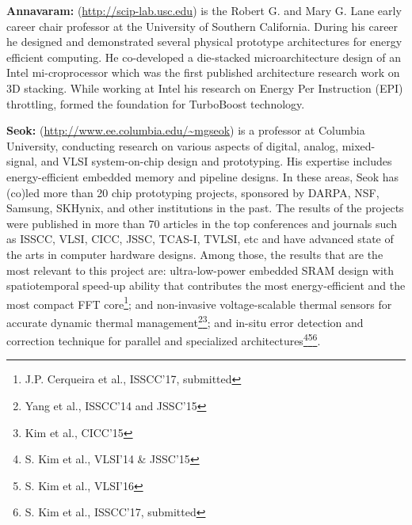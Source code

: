 \noindent
\textbf{Annavaram:} (\url{http://scip-lab.usc.edu}) is the Robert G. and Mary G. Lane early career chair professor at the University of Southern California. 
During his career he designed and demonstrated several physical prototype architectures for energy efficient computing. 
He co-developed a die-stacked microarchitecture design of an Intel mi-croprocessor which was the first published architecture research work on 3D stacking. 
While working at Intel his research on Energy Per Instruction (EPI) throttling, formed the foundation for TurboBoost technology.

\noindent
\textbf{Seok:} (\url{http://www.ee.columbia.edu/~mgseok}) is a professor at Columbia University, conducting research on various aspects of digital, analog, mixed-signal, and VLSI system-on-chip design and prototyping. His expertise includes energy-efficient embedded memory and pipeline designs. In these areas, Seok has (co)led more than 20 chip prototyping projects, sponsored by DARPA, NSF, Samsung, SKHynix, and other institutions in the past. The results of the projects were published in more than 70 articles in the top conferences and journals such as ISSCC, VLSI, CICC, JSSC, TCAS-I, TVLSI, etc and have advanced state of the arts in computer hardware designs. 
Among those, the results that are the most relevant to this project are: ultra-low-power embedded SRAM design with spatiotemporal speed-up ability that contributes the most energy-efficient and the most compact FFT core\footnote{J.P. Cerqueira et al., ISSCC'17, submitted}; and non-invasive voltage-scalable thermal sensors for accurate dynamic thermal management\footnote{Yang et al., ISSCC'14 and JSSC'15}\footnote{Kim et al., CICC'15}; and in-situ error detection and correction technique for parallel and specialized architectures\footnote{S. Kim et al., VLSI'14 \& JSSC'15}\footnote{S. Kim et al., VLSI'16}\footnote{S. Kim et al., ISSCC'17, submitted}.
